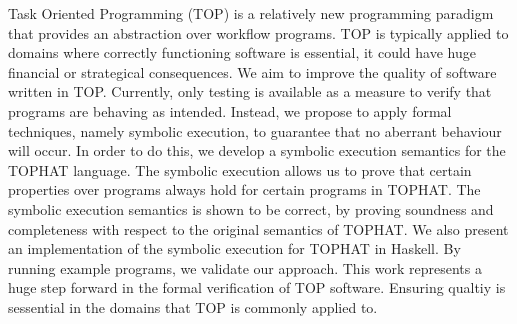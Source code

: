 
Task Oriented Programming (TOP) is a relatively new programming paradigm that provides an abstraction over workflow programs.
TOP is typically applied to domains where correctly functioning software is essential, it could have huge financial or strategical consequences.
We aim to improve the quality of software written in TOP.
Currently, only testing is available as a measure to verify that programs are behaving as intended.
Instead, we propose to apply formal techniques, namely symbolic execution, to guarantee that no aberrant behaviour will occur.
In order to do this, we develop a symbolic execution semantics for the TOPHAT language.
The symbolic execution allows us to prove that certain properties over programs always hold for certain programs in TOPHAT.
The symbolic execution semantics is shown to be correct, by proving soundness and completeness with respect to the original semantics of TOPHAT.
We also present an implementation of the symbolic execution for TOPHAT in Haskell.
By running example programs, we validate our approach.
This work represents a huge step forward in the formal verification of TOP software.
Ensuring qualtiy is sessential in the domains that TOP is commonly applied to.


